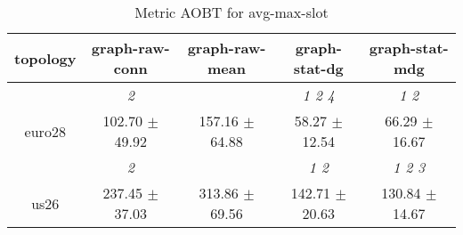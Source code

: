 \begin{table}[h]
\caption{Metric AOBT for avg-max-slot}

        \centering
        \begin{tabular}{
        ccccc} \toprule 
 topology& graph-raw-conn & graph-raw-mean & graph-stat-dg & graph-stat-mdg \\ \toprule
 & \cellcolor[HTML]{EFEFEF} \textit{ 2 }& \cellcolor[HTML]{EFEFEF} & \cellcolor[HTML]{EFEFEF} \textit{ 1 2 4 }& \cellcolor[HTML]{EFEFEF} \textit{ 1 2 } \\ 
 {euro28}& \cellcolor[HTML]{EFEFEF} 102.70 $\pm$ 49.92& \cellcolor[HTML]{EFEFEF} 157.16 $\pm$ 64.88& \cellcolor[HTML]{EFEFEF} 58.27 $\pm$ 12.54& \cellcolor[HTML]{EFEFEF} 66.29 $\pm$ 16.67 \\ 
& \cellcolor[HTML]{EFEFEF} \textit{ 2 }& \cellcolor[HTML]{EFEFEF} & \cellcolor[HTML]{EFEFEF} \textit{ 1 2 }& \cellcolor[HTML]{EFEFEF} \textit{ 1 2 3 } \\ 
 {us26}& \cellcolor[HTML]{EFEFEF} 237.45 $\pm$ 37.03& \cellcolor[HTML]{EFEFEF} 313.86 $\pm$ 69.56& \cellcolor[HTML]{EFEFEF} 142.71 $\pm$ 20.63& \cellcolor[HTML]{EFEFEF} 130.84 $\pm$ 14.67 \\ 

        \bottomrule
        \end{tabular}%

        \end{table}
        
